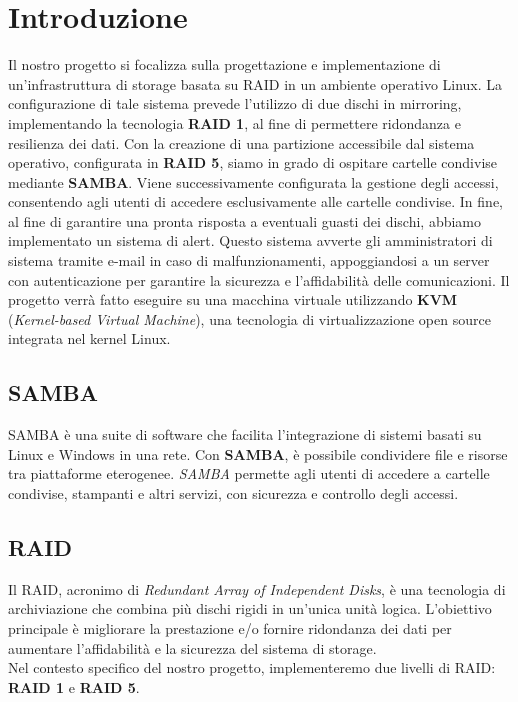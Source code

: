 \documentclass[11pt]{article}
\begin{document}
\pagebreak

\section{Introduzione}
Il nostro progetto si focalizza sulla progettazione e implementazione di un'infrastruttura di storage basata su RAID in un ambiente operativo Linux. La configurazione di tale sistema prevede l'utilizzo di due dischi in mirroring, implementando la tecnologia \textbf{RAID 1}, al fine di permettere ridondanza e resilienza dei dati. Con la creazione di una partizione accessibile dal sistema operativo, configurata in \textbf{RAID 5}, siamo in grado di ospitare cartelle condivise mediante \textbf{SAMBA}. Viene successivamente configurata la gestione degli accessi, consentendo agli utenti di accedere esclusivamente alle cartelle condivise. In fine, al fine di garantire una pronta risposta a eventuali guasti dei dischi, abbiamo implementato un sistema di alert. Questo sistema avverte gli amministratori di sistema tramite e-mail in caso di malfunzionamenti, appoggiandosi a un server con autenticazione per garantire la sicurezza e l'affidabilità delle comunicazioni. Il progetto verrà fatto eseguire su una macchina virtuale utilizzando \textbf{KVM} (\textit{Kernel-based Virtual Machine}), una tecnologia di virtualizzazione open source integrata nel kernel Linux.

\subsection{SAMBA}
SAMBA è una suite di software che facilita l'integrazione di sistemi basati su Linux e Windows in una rete. Con \textbf{SAMBA}, è possibile condividere file e risorse tra piattaforme eterogenee. \textit{SAMBA} permette agli utenti di accedere a cartelle condivise, stampanti e altri servizi, con sicurezza e controllo degli accessi.

\subsection{RAID}
Il RAID, acronimo di \textit{Redundant Array of Independent Disks}, è una tecnologia di archiviazione che combina più dischi rigidi in un'unica unità logica. L'obiettivo principale è migliorare la prestazione e/o fornire ridondanza dei dati per aumentare l'affidabilità e la sicurezza del sistema di storage.
\\
Nel contesto specifico del nostro progetto, implementeremo due livelli di RAID: \textbf{RAID 1} e \textbf{RAID 5}.
\end{document}
